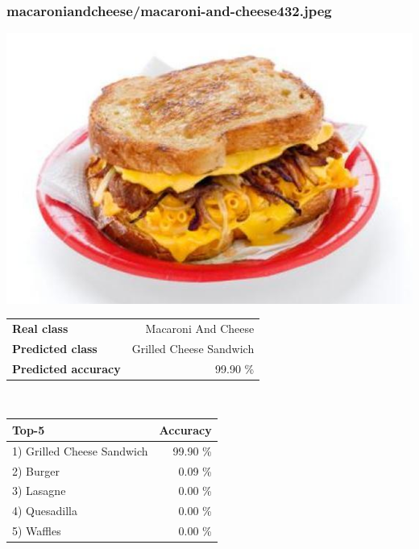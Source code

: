 \subsubsection{macaroni\textunderscore and\textunderscore cheese/macaroni-and-cheese432.jpeg}

\begin{minipage}[t]{0.4\textwidth}
	\vspace{0pt}
	\includegraphics[width=\linewidth]{images/evaluation-images/macaroni_and_cheese/macaroni-and-cheese432.jpeg}
\end{minipage}
\hfill
\begin{minipage}[t]{0.5\textwidth}
	\vspace{0pt}\raggedright
	\begin{tabularx}{\textwidth}{X r}
		\small \textbf{Real class} & \small Macaroni And Cheese\\
		\small \textbf{Predicted class} & \small Grilled Cheese Sandwich\\
		\small \textbf{Predicted accuracy} & \small 99.90 \%
    \end{tabularx}\\
    
    \vspace{6pt}
	\begin{tabularx}{\textwidth}{X r}
        \small \textbf{Top-5} & \small \textbf{Accuracy} \\
        \hline
		\small 1) Grilled Cheese Sandwich & \small 99.90 \%\\\small 2) Burger & \small 0.09 \%\\\small 3) Lasagne & \small 0.00 \%\\\small 4) Quesadilla & \small 0.00 \%\\\small 5) Waffles & \small 0.00 \%
    \end{tabularx}
\end{minipage}
    
